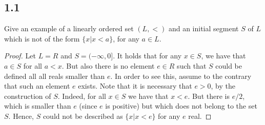 \subsection*{1.1}


    Give an example of a linearly ordered set $(L, <)$ and an initial segment $S$ of $L$ which is not of the form $\{x | x <a\}$, for any $a \in L$.

    \begin{proof}
        Let $L = R$ and $S = (-\infty, 0]$. It holds that for any $x \in S$, we have that $a \in S$ for all $a < x$. But also there is no element $e \in R$ such that $S$ could be defined all all reals smaller than $e$. In order to see this, assume to the contrary that such an element $e$ exists. Note that it is necessary that $e>0$, by the construction of $S$. Indeed, for all $x \in S$ we have that $x < e$. But there is $e / 2$, which is smaller than $e$ (since $e$ is positive) but which does not belong to the set $S$. Hence, $S$ could not be described as $\{x | x < e\}$ for any $e$ real.
    \end{proof}



